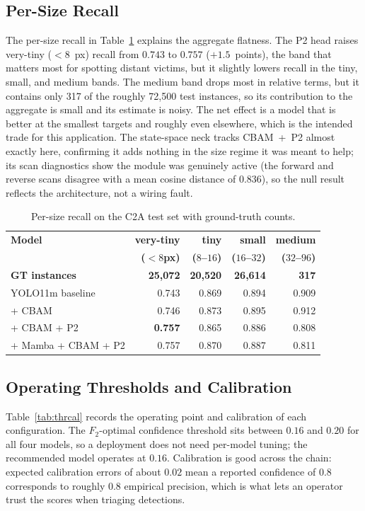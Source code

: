 \subsection{Per-Size Recall}
The per-size recall in Table~\ref{tab:persize} explains the aggregate
flatness. The P2 head raises very-tiny ($<8$~px) recall from $0.743$ to
$0.757$ ($+1.5$~points), the band that matters most for spotting distant
victims, but it slightly lowers recall in the tiny, small, and medium bands.
The medium band drops most in relative terms, but it contains only 317 of the
roughly 72{,}500 test instances, so its contribution to the aggregate is
small and its estimate is noisy. The net effect is a model that is better at
the smallest targets and roughly even elsewhere, which is the intended trade
for this application. The state-space neck tracks CBAM~+~P2 almost exactly
here, confirming it adds nothing in the size regime it was meant to help; its
scan diagnostics show the module was genuinely active (the forward and
reverse scans disagree with a mean cosine distance of $0.836$), so the null
result reflects the architecture, not a wiring fault.

\begin{table}[H]
  \centering
  \caption{Per-size recall on the C2A test set with ground-truth counts.}
  \label{tab:persize}
  \begin{tabular}{@{}l r r r r@{}}
    \toprule
    \textbf{Model} & \textbf{very-tiny} & \textbf{tiny} & \textbf{small} & \textbf{medium} \\
     & \textbf{($<8$px)} & \textbf{($8$--$16$)} & \textbf{($16$--$32$)} & \textbf{($32$--$96$)} \\
    \textbf{GT instances} & \textbf{25{,}072} & \textbf{20{,}520} & \textbf{26{,}614} & \textbf{317} \\
    \midrule
    YOLO11m baseline    & 0.743 & 0.869 & 0.894 & 0.909 \\
    + CBAM              & 0.746 & 0.873 & 0.895 & 0.912 \\
    + CBAM + P2         & \textbf{0.757} & 0.865 & 0.886 & 0.808 \\
    + Mamba + CBAM + P2 & 0.757 & 0.870 & 0.887 & 0.811 \\
    \bottomrule
  \end{tabular}
\end{table}

\subsection{Operating Thresholds and Calibration}
Table~\ref{tab:thrcal} records the operating point and calibration of each
configuration. The $F_2$-optimal confidence threshold sits between $0.16$ and
$0.20$ for all four models, so a deployment does not need per-model tuning;
the recommended model operates at $0.16$. Calibration is good across the
chain: expected calibration errors of about $0.02$ mean a reported confidence
of $0.8$ corresponds to roughly $0.8$ empirical precision, which is what lets
an operator trust the scores when triaging detections.


